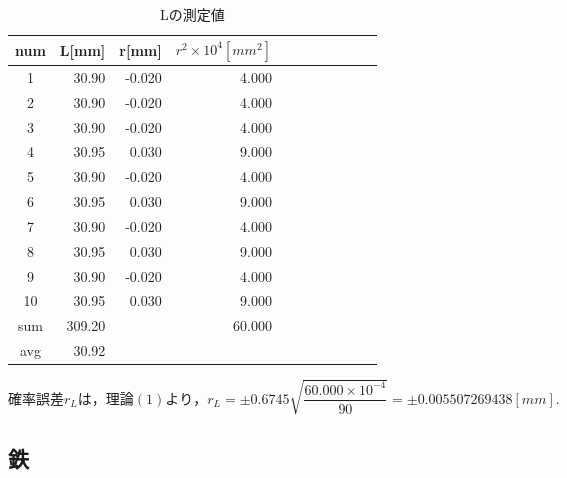 \documentclass[a4paper,1pt]{jsarticle}
\begin{document}
\begin{table}[H]
  \caption{Lの測定値}
  \label{table:SpeedOfLight}
  \centering
  \begin{tabular}{|c||r|r|r|r|r|r|r|r|r|r|}
    \hline
    num & L[mm] & r[mm] & $r^2\times10^4[mm^2]$ \\
    \hline\hline
    1 & 30.90 & -0.020 & 4.000 \\
    2 & 30.90 & -0.020 & 4.000 \\
    3 & 30.90 & -0.020 & 4.000 \\
    4 & 30.95 & 0.030 & 9.000 \\
    5 & 30.90 & -0.020 & 4.000 \\
    6 & 30.95 & 0.030 & 9.000 \\
    7 & 30.90 & -0.020 & 4.000 \\
    8 & 30.95 & 0.030 & 9.000 \\
    9 & 30.90 & -0.020 & 4.000 \\
    10 & 30.95 & 0.030 & 9.000 \\
    \hline\hline
    sum & 309.20 &  & 60.000 \\
    \hline
    avg & 30.92 &  &  \\

    \hline
  \end{tabular}


\end{table}

$確率誤差r_Lは，理論(1)より，r_L=\pm0.6745\sqrt{\dfrac{60.000\times10^{-4}}{90}}=\pm0.005507269438[mm].$





\clearpage

\subsection*{鉄}
\end{document}
